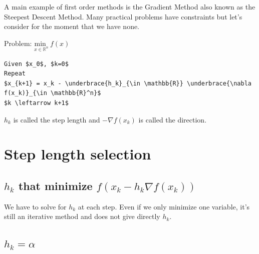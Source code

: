 A main example of first order methods is the Gradient Method also known as the Steepest Descent Method. Many practical problems have constraints but let's consider for the moment that we have none.  
 
Problem:  $\underset{x  \in \mathbb{R}^n}{\text{min }} \: f(x) $
 
\begin{lstlisting}[mathescape,caption=Gradient Algorithm]
Given $x_0$, $k=0$
Repeat
$x_{k+1} = x_k - \underbrace{h_k}_{\in \mathbb{R}} \underbrace{\nabla f(x_k)}_{\in \mathbb{R}^n}$
$k \leftarrow k+1$
\end{lstlisting}

$h_k$ is called the step length and $-\nabla f(x_k)$ is called the direction.


\section{Step length selection}

\subsection{ $h_k$ that minimize $f(x_k - h_k \nabla f(x_k))$} 

We have to solve for $h_k$ at each step. Even if we only minimize one variable, it's still an iterative method and does not give directly $h_k$. 

\subsection{$h_k = \alpha$}

